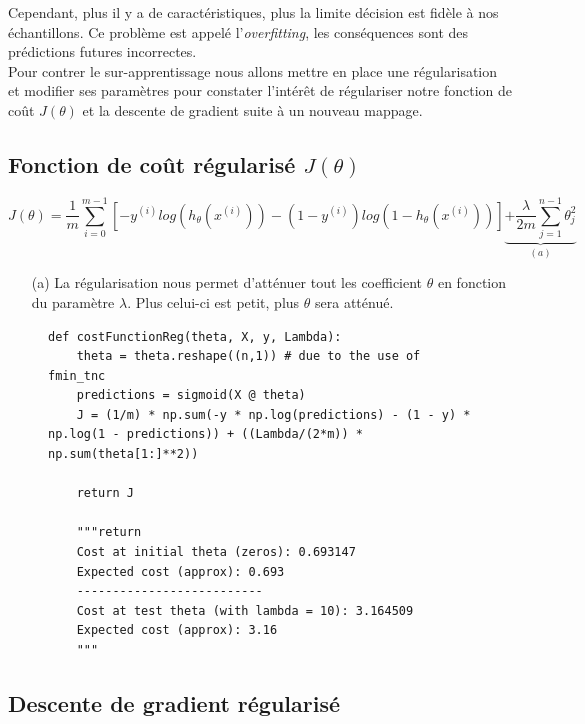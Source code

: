 Cependant, plus il y a de caractéristiques, plus la limite décision est fidèle à nos échantillons. Ce problème est appelé l'\textit{overfitting}, les conséquences sont des prédictions futures 
incorrectes. \\
Pour contrer le sur-apprentissage nous allons mettre en place une régularisation et modifier ses paramètres pour constater l'intérêt de régulariser notre fonction de coût $J(\theta)$ et 
la descente de gradient suite à un nouveau mappage.

\subsection{Fonction de coût régularisé $J(\theta)$}

\begin{equation}\label{eq:cout-reg}
    J(\theta) = \frac{1}{m} \sum_{i=0}^{m-1}[-y^{(i)} log(h_\theta(x^{(i)})) - (1-y^{(i)}) log(1-h_\theta(x^{(i)}))] \underbrace{+ \frac{\lambda}{2m} \sum_{j=1}^{n-1} \theta_j^2}_{(a)}
\end{equation}

\begin{itemize}
    \item [(a)] La régularisation nous permet d'atténuer tout les coefficient $\theta$ en fonction du paramètre $\lambda$. Plus celui-ci est petit, plus $\theta$ sera atténué.
\end{itemize}

\begin{figure}[!h]
\begin{verbatim}
def costFunctionReg(theta, X, y, Lambda):
    theta = theta.reshape((n,1)) # due to the use of fmin_tnc
    predictions = sigmoid(X @ theta)
    J = (1/m) * np.sum(-y * np.log(predictions) - (1 - y) * np.log(1 - predictions)) + ((Lambda/(2*m)) * np.sum(theta[1:]**2))
          
    return J

    """return 
    Cost at initial theta (zeros): 0.693147
    Expected cost (approx): 0.693
    -------------------------- 
    Cost at test theta (with lambda = 10): 3.164509
    Expected cost (approx): 3.16
    """
\end{verbatim}   
\end{figure}
    


\subsection{Descente de gradient régularisé}

